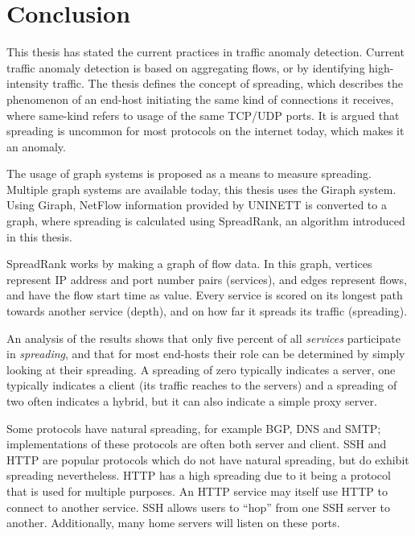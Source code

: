 \chapter{Conclusion}
\label{chp:conclusion}

This thesis has stated the current practices in traffic anomaly detection.
Current traffic anomaly detection is based on aggregating flows,
 or by identifying high-intensity traffic.
The thesis defines the concept of spreading,
 which describes the phenomenon of an end-host initiating the same kind of connections it receives,
 where same-kind refers to usage of the same TCP/UDP ports.
It is argued that spreading is uncommon for most protocols on the internet today, which makes it an anomaly.

The usage of graph systems is proposed as a means to measure spreading.
Multiple graph systems are available today, this thesis uses the Giraph system.
Using Giraph, NetFlow information provided by UNINETT is converted to a graph,
 where spreading is calculated using SpreadRank, an algorithm introduced in this thesis.

SpreadRank works by making a graph of flow data.
In this graph, vertices represent IP address and port number pairs (\gls{service}s),
 and edges represent flows, and have the flow start time as value.
Every service is scored on its longest path towards another service (\gls{depth}),
 and on how far it spreads its traffic (\gls{spreading}).

An analysis of the results shows that only five percent of all \emph{\gls{service}s} participate in \emph{\gls{spreading}},
 and that for most end-hosts their role can be determined by simply looking at their spreading.
A spreading of zero typically indicates a server, one typically indicates a client (its traffic reaches to the servers) and a spreading of two often indicates a hybrid, but it can also indicate a simple proxy server.

Some protocols have natural spreading, for example \gls{BGP}, \gls{DNS} and \gls{SMTP};
 implementations of these protocols are often both server and client.
\Gls{SSH} and \gls{HTTP} are popular protocols which do not have natural spreading,
 but do exhibit spreading nevertheless.
\Gls{HTTP} has a high \gls{spreading} due to it being a protocol that is used for multiple purposes.
An \gls{HTTP} \gls{service} may itself use \gls{HTTP} to connect to another \gls{service}.
\Gls{SSH} allows users to ``hop'' from one SSH server to another.
Additionally, many home servers will listen on these ports.

